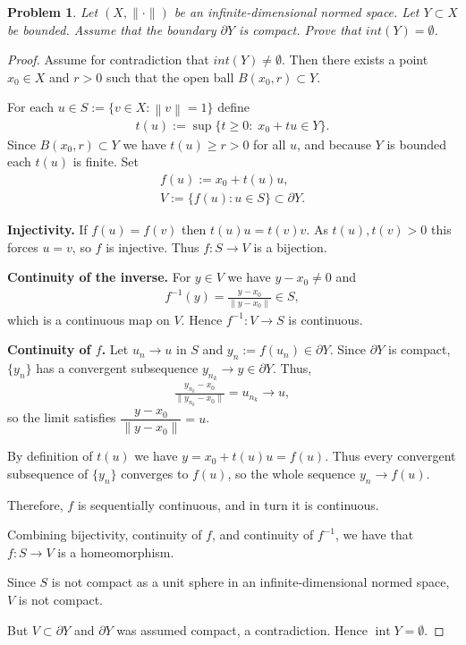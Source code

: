 \documentclass{article}
\newcommand{\norm}[1]{\left\|#1\right\|}
\newtheorem{problem}{Problem}
\begin{document}
\begin{problem}
    Let $(X, \|\cdot\|)$ be an infinite-dimensional normed space. Let $Y \subset X$ be bounded.  
    Assume that the boundary $\partial Y$ is compact.  
    Prove that $ int(Y) = \emptyset$.
\end{problem}
\begin{proof}

    Assume for contradiction that $int(Y) \neq \emptyset$.  
    Then there exists a point $x_0 \in X$ and $r > 0$ such that the open ball $ B(x_0, r) \subset Y$.
    
    For each $u\in S:=\{v\in X:\norm{v}=1\}$ define
    \begin{align}
        t(u):=\sup\{t\ge0:\; x_0+t u\in Y\}.
    \end{align}
    Since $B(x_0,r)\subset Y$ we have $t(u)\ge r>0$ for all $u$, and because $Y$ is bounded each $t(u)$ is finite.
    Set
    \begin{align}
        f(u):=x_0+t(u)u,
        \\
        V:=\{f(u):u\in S\}\subset\partial Y.
    \end{align}

    \textbf{Injectivity.} If $f(u)=f(v)$ then $t(u)u=t(v)v$. As $t(u),t(v)>0$ this forces $u=v$, so $f$ is injective. Thus $f:S\to V$ is a bijection.

    \textbf{Continuity of the inverse.} For $y\in V$ we have $y-x_0\neq0$ and
    \begin{align}
        f^{-1}(y)=\frac{y-x_0}{\|y-x_0\|}\in S,
    \end{align}
    which is a continuous map on $V$. Hence $f^{-1}:V\to S$ is continuous.

    \textbf{Continuity of $f$.} Let $u_n\to u$ in $S$ and $y_n:=f(u_n) \in \partial Y$. Since $\partial Y$ is compact, $\{y_n\}$ has a convergent subsequence $y_{n_k}\to y \in \partial Y$. Thus,
    \begin{align}
        \frac{y_{n_k}-x_0}{\|y_{n_k}-x_0\|}=u_{n_k}\to u,
    \end{align}
    so the limit satisfies $\dfrac{y-x_0}{\|y-x_0\|}=u$. 
    
    By definition of $t(u)$ we have $y=x_0+t(u)u=f(u)$. 
    Thus every convergent subsequence of $\{y_n\}$ converges to $f(u)$, so the whole sequence $y_n \to f(u)$. 
    
    Therefore, $f$ is sequentially continuous, and in turn it is continuous.

    Combining bijectivity, continuity of $f$, and continuity of $f^{-1}$, we have that $f:S\to V$ is a homeomorphism.

    Since $S$ is not compact as a unit sphere in an infinite-dimensional normed space, $V$ is not compact.
    
    But $V\subset\partial Y$ and $\partial Y$ was assumed compact, a contradiction. Hence $\operatorname{int}Y=\emptyset$.

\end{proof}
\end{document}
